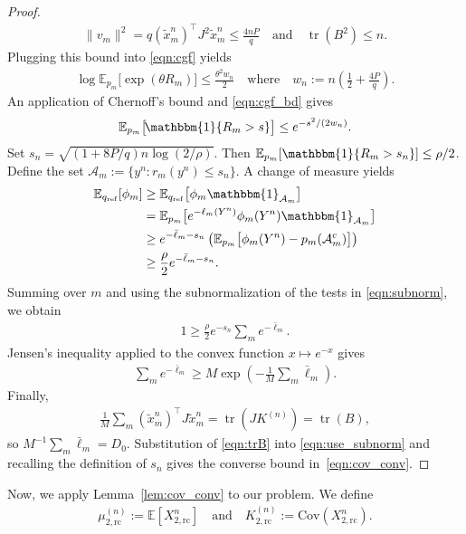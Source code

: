 \documentclass[11pt,onecolumn]{IEEEtran}
\newcommand{\nn}{\nonumber}
\newcommand{\calA}{\mathcal{A}}
\newcommand{\bbE}{\mathbb{E}}
\newcommand{\tilx}{\tilde{x}}
\DeclareMathOperator{\tr}{tr}
\newcommand{\rc}{\mathrm{rc}}
\begin{document}
\begin{proof}
\begin{align}
    \|v_m\|^2  = q (\tilx_m^n)^\top J^2 \tilx_m^n\le\frac{4nP}{q} \quad \mbox{and}\quad \tr(B^2)\le n. 
\end{align}
Plugging this bound into \eqref{eqn:cgf} yields
\begin{align}
    \log \bbE_{p_m}\big[ \!\exp(\theta R_m) \big] \le\frac{\theta^2w_n}{2}\quad \mbox{where}\quad w_n:=n\left( \frac{1}{2}+\frac{4P}{q}\right). \label{eqn:cgf_bd}
\end{align}
An application of Chernoff's bound and \eqref{eqn:cgf_bd} gives
\begin{align}
    \bbE_{p_m}\big[\!\mathbbm{1} \{R_m>s\} \big]\le e^{-s^2/(2w_n)}.
\end{align}
Set $s_n=\sqrt{(1+8P/q)n\log(2/\rho)}$. Then $\bbE_{p_m} [\mathbbm{1} \{R_m>s_n\}  ]\le\rho/2$. Define the set $\calA_m:=\{y^n:r_m(y^n)\le s_n\}$. A change of measure yields
\begin{align}
    \bbE_{q_{\mathrm{ref}}}[\phi_m]&\ge\bbE_{q_{\mathrm{ref}}}\big[\phi_m\mathbbm{1}_{\calA_m} \big]\nn\\
    &=\bbE_{p_m}\big[e^{-\ell_m(Y^n)}\phi_m(Y^n)\mathbbm{1}_{\calA_m}\big]\nn\\
    &\ge e^{-\bar{\ell}_m-s_n}\left(\bbE_{p_m}\big[\phi_m(Y^n)-p_m(\calA_m^c) \big] \right)\nn\\
    &\ge\frac{\rho}{2}e^{-\bar{\ell}_m-s_n}.
\end{align}
Summing over $m$ and using the subnormalization of the tests in \eqref{eqn:subnorm}, we obtain
\begin{align}
    1\ge\frac{\rho}{2}e^{-s_n}\sum_m e^{-\bar{\ell}_m}. \label{eqn:use_subnorm}
\end{align}
Jensen's inequality applied to the convex function $x\mapsto e^{-x}$ gives 
\begin{align}
    \sum_m e^{-\bar{\ell}_m}\ge M \exp\left(-\frac{1}{M}\sum_m\bar{\ell}_m\right).
\end{align}
Finally, 
\begin{align}
    \frac{1}{M}\sum_{m} (\tilx_m^n)^\top J \tilx_m^n=\tr(J K^{(n)})=\tr(B) ,\label{eqn:trB}
\end{align}
so $M^{-1}\sum_m\bar{\ell}_m=D_0$. Substitution of  \eqref{eqn:trB} into \eqref{eqn:use_subnorm} and recalling the definition of $s_n$ gives the converse bound in~\eqref{eqn:cov_conv}.
\end{proof}
Now, we apply Lemma~\ref{lem:cov_conv} to our problem. We define
\begin{align}
    \mu_{2,\rc}^{(n)}:=\bbE [X_{2,\rc}^n]\quad\mbox{and}\quad K_{2,\rc}^{(n)}:=\mathrm{Cov}(X_{2,\rc}^n).
\end{align}
\end{document}
